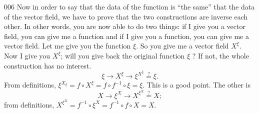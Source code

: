 \begin{corrige}{006}
Now in order to say that the data of the function is ``the same'' that the data of the vector field, we have to prove that the two constructions are inverse each other. In other words, you are now able to do two things: if I give you a vector field, you can give me a function and if I give you a function, you can give me a vector field. Let me give you the function $\xi$. So you give me a vector field $X^{\xi}$. Now I give you $X^{\xi}$; will you give back the original function $\xi$ ? If not, the whole construction has no interest.
\[ 
  \xi\to X^{\xi}\to\xi^{X^{\xi}}\stackrel{?}{=}\xi.
\]
From definitions, $\xi^{X_{\xi}}=f\circ X^{\xi}=f\circ f^{-1}\circ\xi=\xi$. This is a good point. The other is 
\[ 
  X\to\xi^X\to X^{\xi^X}\stackrel{?}{=}X;
\]
from definitions, $X^{\xi^X}=f^{-1}\circ\xi^X=f^{-1}\circ f\circ X=X$.


\end{corrige}
